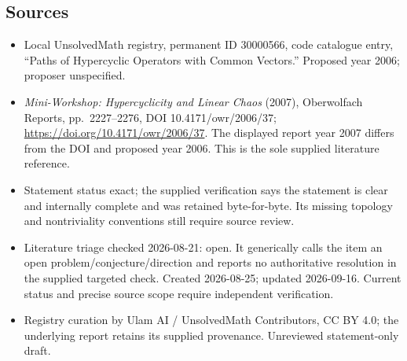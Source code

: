 \documentclass[11pt]{article}
\begin{document}
\subsection{Sources}
\begin{itemize}
\item Local UnsolvedMath registry, permanent ID 30000566, code catalogue entry, ``Paths of Hypercyclic Operators with Common Vectors.'' Proposed year 2006; proposer unspecified.
\item \emph{Mini-Workshop: Hypercyclicity and Linear Chaos} (2007), Oberwolfach Reports, pp.\ 2227--2276, DOI 10.4171/owr/2006/37; \url{https://doi.org/10.4171/owr/2006/37}. The displayed report year 2007 differs from the DOI and proposed year 2006. This is the sole supplied literature reference.
\item Statement status exact; the supplied verification says the statement is clear and internally complete and was retained byte-for-byte. Its missing topology and nontriviality conventions still require source review.
\item Literature triage checked 2026-08-21: open. It generically calls the item an open problem/conjecture/direction and reports no authoritative resolution in the supplied targeted check. Created 2026-08-25; updated 2026-09-16. Current status and precise source scope require independent verification.
\item Registry curation by Ulam AI / UnsolvedMath Contributors, CC BY 4.0; the underlying report retains its supplied provenance. Unreviewed statement-only draft.
\end{itemize}
\end{document}
